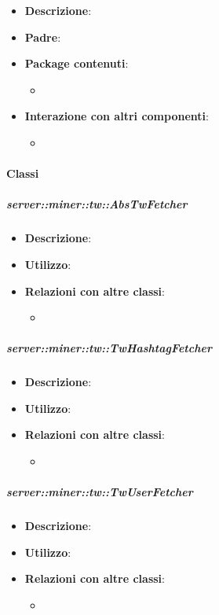 \begin{itemize}
  \item \textbf{Descrizione}:
  \item \textbf{Padre}:
  \item \textbf{Package contenuti}:
  	\begin{itemize}
  		\item
  	\end{itemize}
  \item \textbf{Interazione con altri componenti}:
  	\begin{itemize}
  		\item  	
  	\end{itemize}
\end{itemize}	

	\paragraph{Classi} %
	\subparagraph{server::miner::tw::AbsTwFetcher} %
		\label{subp:server_miner_tw_AbsTwFetcher}
			\begin{itemize}
				\item \textbf{Descrizione}:
				\item \textbf{Utilizzo}: 
				\item \textbf{Relazioni con altre classi}:
					\begin{itemize}
						\item 
					\end{itemize}
			\end{itemize}
		
	\subparagraph{server::miner::tw::TwHashtagFetcher} %
		\label{subp:server_miner_tw_TwHashtagFetcher}
			\begin{itemize}
				\item \textbf{Descrizione}:
				\item \textbf{Utilizzo}: 
				\item \textbf{Relazioni con altre classi}:
					\begin{itemize}
						\item 
					\end{itemize}
			\end{itemize}
		
	\subparagraph{server::miner::tw::TwUserFetcher} %
		\label{subp:server_miner_tw_TwUserFetcher}
			\begin{itemize}
				\item \textbf{Descrizione}:
				\item \textbf{Utilizzo}: 
				\item \textbf{Relazioni con altre classi}:
					\begin{itemize}
						\item 
					\end{itemize}
			\end{itemize}
		
